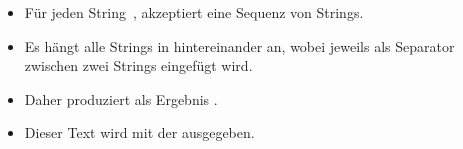 \documentclass[aspectratio=169,mathserif,notheorems]{beamer}%
\begin{document}
\begin{frame}[t]
{{\begin{itemize}
{}%
\item<49-> Für jeden String~, akzeptiert  eine Sequenz  von Strings.%
%
\item<50-> Es hängt alle Strings in  hintereinander an, wobei jeweils  als Separator zwischen zwei Strings eingefügt wird.%
%
\item<51-> Daher produziert  als Ergebnis .%
%
\item<52-> Dieser Text wird mit der  ausgegeben.%
\end{itemize}%
}}%
%
%
%
%
\end{frame}%
%
\end{document}
